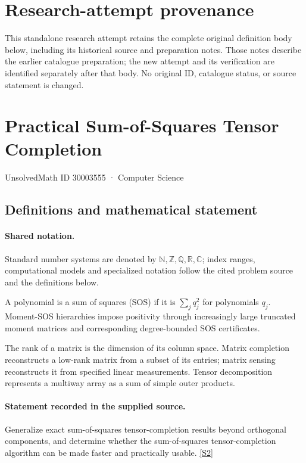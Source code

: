 \documentclass[11pt]{article}
\begin{document}
\section*{Research-attempt provenance}
This standalone research attempt retains the complete original definition body below,
including its historical source and preparation notes. Those notes describe the
earlier catalogue preparation; the new attempt and its verification are identified
separately after that body. No original ID, catalogue status, or source statement is changed.

\section{Practical Sum-of-Squares Tensor Completion}\label{30003555}
{\small UnsolvedMath ID 30003555 · Computer Science}
\subsection{Definitions and mathematical statement}

\paragraph{Shared notation.}Standard number systems are denoted by $\mathbb N,\mathbb Z,\mathbb Q,\mathbb R,\mathbb C$; index ranges, computational models and specialized notation follow the cited problem source and the definitions below.


A polynomial is a sum of squares (SOS) if it is $\sum_j q_j^2$ for polynomials $q_j$. Moment-SOS hierarchies impose positivity through increasingly large truncated moment matrices and corresponding degree-bounded SOS certificates.

The rank of a matrix is the dimension of its column space. Matrix completion reconstructs a low-rank matrix from a subset of its entries; matrix sensing reconstructs it from specified linear measurements. Tensor decomposition represents a multiway array as a sum of simple outer products.
\paragraph{Statement recorded in the supplied source.}
Generalize exact sum-of-squares tensor-completion results beyond orthogonal components, and determine whether the sum-of-squares tensor-completion algorithm can be made faster and practically usable. \href{https://doi.org/10.4171/owr/2017/37}{[S2]}
\end{document}
